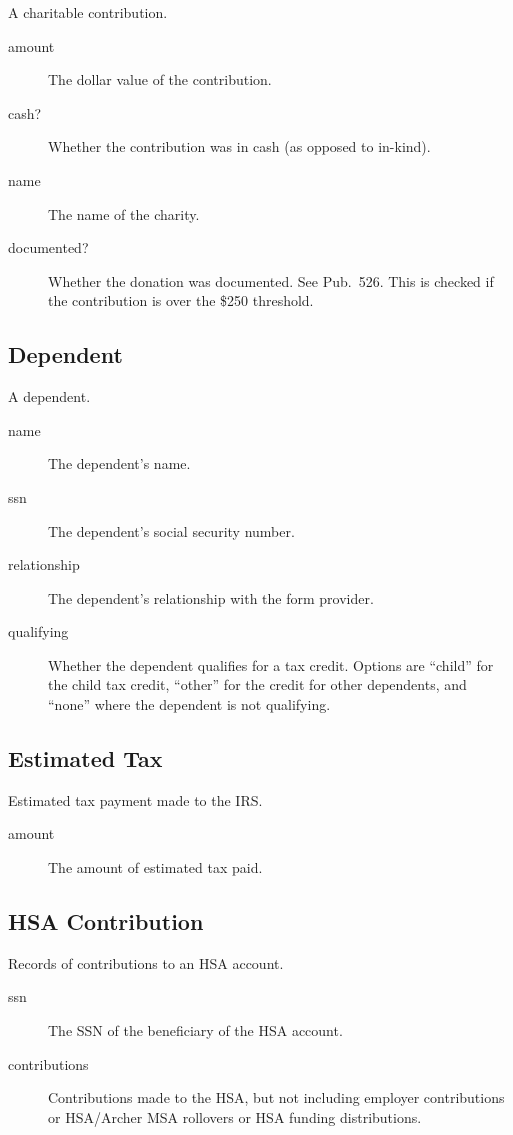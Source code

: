 \documentclass[12pt]{article}
\begin{document}
A charitable contribution.

\begin{description}
\item[amount] The dollar value of the contribution.
\item[cash?] Whether the contribution was in cash (as opposed to in-kind).
\item[name] The name of the charity.
\item[documented?] Whether the donation was documented. See Pub.\ 526. This is
checked if the contribution is over the \$250 threshold.
\end{description}



\subsection{Dependent}

A dependent.

\begin{description}
\item[name] The dependent's name.
\item[ssn] The dependent's social security number.
\item[relationship] The dependent's relationship with the form provider.
\item[qualifying] Whether the dependent qualifies for a tax credit. Options are
``child'' for the child tax credit, ``other'' for the credit for other
dependents, and ``none'' where the dependent is not qualifying.
\end{description}


\subsection{Estimated Tax}

Estimated tax payment made to the IRS.

\begin{description}
\item[amount] The amount of estimated tax paid.
\end{description}

\subsection{HSA Contribution}

Records of contributions to an HSA account.

\begin{description}
\item[ssn] The SSN of the beneficiary of the HSA account.
\item[contributions] Contributions made to the HSA, but not including employer
contributions or HSA/Archer MSA rollovers or HSA funding distributions.
\end{description}
\end{document}
